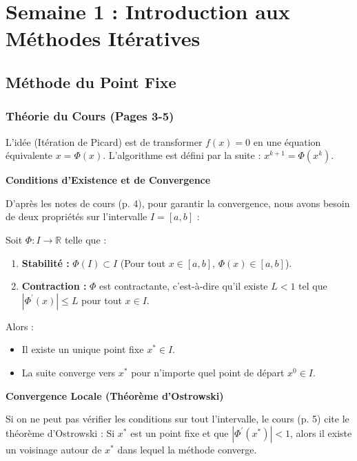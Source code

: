 \section{Semaine 1 : Introduction aux Méthodes Itératives}

\subsection{Méthode du Point Fixe} 

\subsubsection*{Théorie du Cours (Pages 3-5)} 

L'idée (Itération de Picard) est de transformer $f(x)=0$ en une équation équivalente $x=\Phi(x).$ L'algorithme est défini par la suite : $x^{k+1}=\Phi(x^{k})$.

\textbf{Conditions d'Existence et de Convergence} 

D'après les notes de cours (p. 4), pour garantir la convergence, nous avons besoin de deux propriétés sur l'intervalle $I=[a,b]$ : 

\begin{theoreme} 
Soit $\Phi:I\rightarrow\mathbb{R}$ telle que : 
\begin{enumerate}
    \item \textbf{Stabilité :} $\Phi(I)\subset I$ (Pour tout $x\in[a,b]$, $\Phi(x)\in[a,b]$).
    \item \textbf{Contraction :} $\Phi$ est contractante, c'est-à-dire qu'il existe $L<1$ tel que $|\Phi^{\prime}(x)|\le L$ pour tout $x\in I$.
\end{enumerate}
Alors : 
\begin{itemize}
    \item Il existe un unique point fixe $x^{*}\in I$.
    \item La suite converge vers $x^{*}$ pour n'importe quel point de départ $x^{0}\in I$.
\end{itemize}
\end{theoreme}

\textbf{Convergence Locale (Théorème d'Ostrowski)} 

Si on ne peut pas vérifier les conditions sur tout l'intervalle, le cours (p. 5) cite le théorème d'Ostrowski : Si $x^{*}$ est un point fixe et que $|\Phi^{\prime}(x^{*})|<1$, alors il existe un voisinage autour de $x^{*}$ dans lequel la méthode converge.

